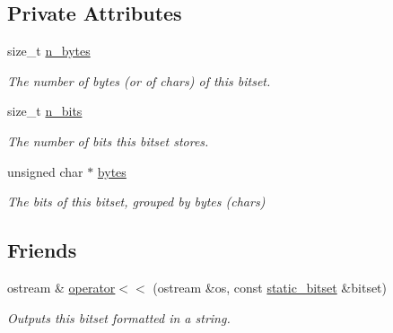 \subsection*{Private Attributes}
\begin{DoxyCompactItemize}
\item 
size\+\_\+t \hyperlink{classlgraph_1_1utils_1_1static__bitset_aa3f7a6d10e41df757ca86e3636cb85d4}{n\+\_\+bytes}\hypertarget{classlgraph_1_1utils_1_1static__bitset_aa3f7a6d10e41df757ca86e3636cb85d4}{}\label{classlgraph_1_1utils_1_1static__bitset_aa3f7a6d10e41df757ca86e3636cb85d4}

\begin{DoxyCompactList}\small\item\em The number of bytes (or of chars) of this bitset. \end{DoxyCompactList}\item 
size\+\_\+t \hyperlink{classlgraph_1_1utils_1_1static__bitset_aebc02986838d70f13d3c10f390d11211}{n\+\_\+bits}\hypertarget{classlgraph_1_1utils_1_1static__bitset_aebc02986838d70f13d3c10f390d11211}{}\label{classlgraph_1_1utils_1_1static__bitset_aebc02986838d70f13d3c10f390d11211}

\begin{DoxyCompactList}\small\item\em The number of bits this bitset stores. \end{DoxyCompactList}\item 
unsigned char $\ast$ \hyperlink{classlgraph_1_1utils_1_1static__bitset_a56d277fc22bbf71a27fca530a133c9bd}{bytes}\hypertarget{classlgraph_1_1utils_1_1static__bitset_a56d277fc22bbf71a27fca530a133c9bd}{}\label{classlgraph_1_1utils_1_1static__bitset_a56d277fc22bbf71a27fca530a133c9bd}

\begin{DoxyCompactList}\small\item\em The bits of this bitset, grouped by bytes (chars) \end{DoxyCompactList}\end{DoxyCompactItemize}
\subsection*{Friends}
\begin{DoxyCompactItemize}
\item 
ostream \& \hyperlink{classlgraph_1_1utils_1_1static__bitset_a5411e42c0490c3035daa55e92a709303}{operator$<$$<$} (ostream \&os, const \hyperlink{classlgraph_1_1utils_1_1static__bitset}{static\+\_\+bitset} \&bitset)\hypertarget{classlgraph_1_1utils_1_1static__bitset_a5411e42c0490c3035daa55e92a709303}{}\label{classlgraph_1_1utils_1_1static__bitset_a5411e42c0490c3035daa55e92a709303}

\begin{DoxyCompactList}\small\item\em Outputs this bitset formatted in a string. \end{DoxyCompactList}\end{DoxyCompactItemize}


